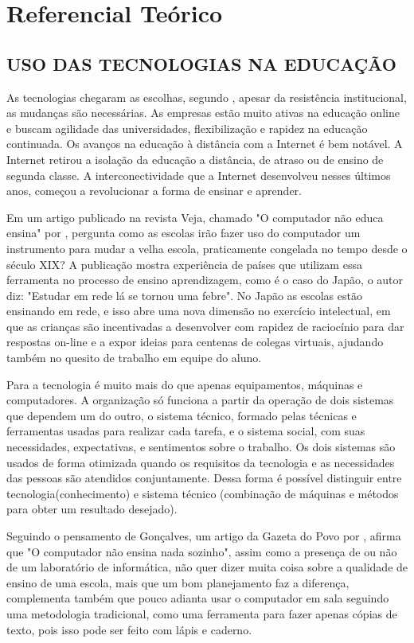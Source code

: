 \chapter[REFERENCIAL TEÓRICO]{Referencial Teórico}

\section{USO DAS TECNOLOGIAS NA EDUCAÇÃO}

As tecnologias chegaram as escolhas, segundo , apesar da resistência institucional, as mudanças são necessárias. As empresas estão muito ativas na educação online e buscam agilidade das universidades, flexibilização e rapidez na educação continuada. Os avanços na educação à distância com a Internet é bem notável. A Internet retirou a isolação da educação a distância, de atraso ou de ensino de segunda classe. A interconectividade que a Internet desenvolveu nesses últimos anos, começou a revolucionar a forma de ensinar e aprender.
\par
Em um artigo publicado na revista Veja, chamado "O computador não educa ensina" por , pergunta como as escolas irão fazer uso do computador um instrumento para mudar a velha escola, praticamente congelada no tempo desde o século XIX? A publicação mostra experiência de países que utilizam essa ferramenta no processo de ensino aprendizagem, como é o caso do Japão, o autor diz: "Estudar em rede lá se tornou uma febre". No Japão as escolas estão ensinando em rede, e isso abre uma nova dimensão no exercício intelectual, em que as crianças são incentivadas a desenvolver com rapidez de raciocínio para dar respostas on-line e a expor ideias para centenas de colegas virtuais, ajudando também no quesito de trabalho em equipe do aluno.
\par
Para   a tecnologia é muito mais do que apenas equipamentos, máquinas e computadores. A organização só funciona a partir da operação de dois sistemas que dependem um do outro, o sistema técnico, formado pelas técnicas e ferramentas usadas para realizar cada tarefa, e o sistema social, com suas necessidades, expectativas, e sentimentos sobre o trabalho. Os dois sistemas são usados de forma otimizada quando os requisitos da tecnologia e as necessidades das pessoas são atendidos conjuntamente. Dessa forma é possível distinguir entre tecnologia(conhecimento) e sistema técnico (combinação de máquinas e métodos para obter um resultado desejado).
\par
Seguindo o pensamento de Gonçalves, um artigo da Gazeta do Povo por , afirma que "O computador não ensina nada sozinho", assim como a presença de ou não de um laboratório de informática, não quer dizer muita coisa sobre a qualidade de ensino de uma escola, mais que um bom planejamento faz a diferença, complementa também que pouco adianta usar o computador em sala seguindo uma metodologia tradicional, como uma ferramenta para fazer apenas cópias de texto, pois isso pode ser feito com lápis e caderno.

